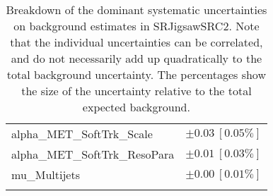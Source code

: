 \begin{table}
\begin{center}
\begin{tabular*}{\textwidth}{@{\extracolsep{\fill}}lc}
alpha\_MET\_SoftTrk\_Scale         & $\pm 0.03\ [0.05\%] $       \\
alpha\_MET\_SoftTrk\_ResoPara         & $\pm 0.01\ [0.03\%] $       \\
mu\_Multijets         & $\pm 0.00\ [0.01\%] $       \\
\noalign{\smallskip}\hline\noalign{\smallskip}
\end{tabular*}
\end{center}
\caption[Breakdown of uncertainty on background estimates]{
Breakdown of the dominant systematic uncertainties on background estimates in SRJigsawSRC2.
Note that the individual uncertainties can be correlated, and do not necessarily add up quadratically to 
the total background uncertainty. The percentages show the size of the uncertainty relative to the total expected background.
\label{table.results.bkgestimate.uncertainties.SRJigsawSRC2}}
\end{table}
%
